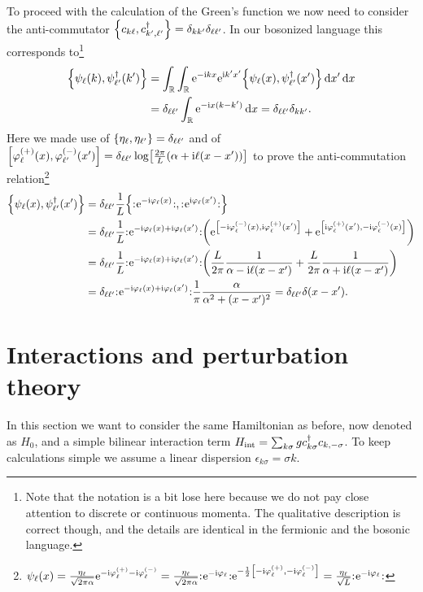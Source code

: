 \documentclass[english, parskip=full]{scrartcl}
\begin{document}
To proceed with the calculation of the Green's function we now need to consider the anti-commutator $\klc*{c_{k\ell}, c_{k',\ell'}^\dagger} = \delta_{kk'} \delta_{\ell\ell'}$.
In our bosonized language this corresponds to\footnote{Note that the notation is a bit lose here because we do not pay close attention to discrete or continuous momenta. 
The qualitative description is correct though, and the details are identical in the fermionic and the bosonic language.}
\begin{align}
\klc*{\psi_\ell(k), \psi_{\ell'}^\dagger(k')} &= \intr{\intr{\powe{-\i kx} \powe{\i k'x'} \klc*{\psi_\ell(x), \psi_{\ell'}^\dagger(x')} }{x'} }{x}\\
&= \delta_{\ell\ell'} \intr{\powe{-\i x(k-k')}}{x} = \delta_{\ell\ell'} \delta_{kk'}.
\end{align}
Here we made use of $\klc*{\eta_\ell, \eta_{\ell'}} = \delta_{\ell\ell'}$ and of $\klb*{\varphi_\ell^{(+)}(x), \varphi_{\ell'}^{(-)}(x')} = \delta_{\ell\ell'} \log\klb*{\frac{2\pi}{L} \kla*{\alpha + \i\ell (x-x')}}$ to prove the anti-commutation relation\footnote{$\psi_\ell(x) = \frac{\eta_\ell}{\sqrt{2\pi\alpha}} \powe{-\i\varphi_\ell^{(+)} - \i\varphi_\ell^{(-)}} = \frac{\eta_\ell}{\sqrt{2\pi\alpha}} \normord{\powe{-\i\varphi_\ell}} \powe{-\frac{1}{2}\klb*{-\i\varphi_\ell^{(+)}, -\i\varphi_\ell^{(-)}} } = \frac{\eta_\ell}{\sqrt{L}} \normord{\powe{-\i\varphi_\ell}}$}
\begin{align}
\klc*{\psi_\ell(x), \psi_{\ell'}^\dagger(x')} &= \delta_{\ell\ell'} \frac{1}{L} \klc*{\normord{\powe{-\i\varphi_\ell(x)}}, \normord{\powe{\i \varphi_\ell(x')}}} \\
&= \delta_{\ell\ell'} \frac{1}{L} \normord{\powe{-\i\varphi_\ell(x) + \i\varphi_\ell(x')}} \kla*{\powe{\klb*{-\i\varphi_\ell^{(-)}(x), \i\varphi_\ell^{(+)}(x')}} + \powe{\klb*{\i\varphi_\ell^{(+)}(x'), -\i\varphi_\ell^{(-)}(x)}}}\\
&= \delta_{\ell\ell'} \frac{1}{L} \normord{\powe{-\i\varphi_\ell(x) + \i\varphi_\ell(x')}} \kla*{\frac{L}{2\pi} \frac{1}{\alpha - \i\ell(x-x')} + \frac{L}{2\pi} \frac{1}{\alpha + \i\ell(x-x')}}\\
&= \delta_{\ell\ell'} \normord{\powe{-\i\varphi_\ell(x) + \i\varphi_\ell(x')}} \frac{1}{\pi} \frac{\alpha}{\alpha^2 + (x-x')^2} = \delta_{\ell\ell'} \delta(x-x').
\end{align}
\section{Interactions and perturbation theory}
In this section we want to consider the same Hamiltonian as before, now denoted as $H_0$, and a simple bilinear interaction term $H_\Text{int} = \sum_{k\sigma} g c_{k\sigma}^\dagger c_{k,-\sigma}$.
To keep calculations simple we assume a linear dispersion $\epsilon_{k\sigma} = \sigma k$.
\end{document}
